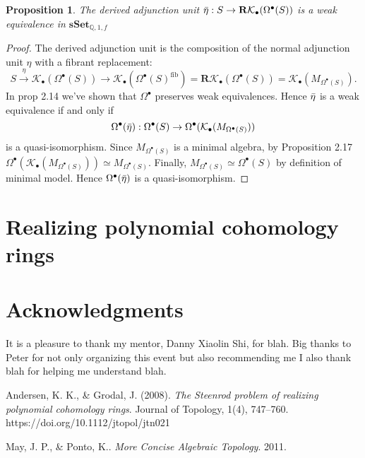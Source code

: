 \documentclass[psamsfonts]{amsart}
\newtheorem{prop}{Proposition}[section]
\theoremstyle{definition}
\newcommand{\Q}{\mathbb{Q}}
\newcommand{\sSet}{\mathbf{sSet}}
\numberwithin{equation}{section}
\begin{document}
\begin{prop}
The derived adjunction unit $\Bar{\eta}:S\to\mathbf{R}\mathcal{K}_\bullet(\Omega^\bullet(S))$ is a weak equivalence in $\sSet_{\Q,1,f}$
\end{prop}
\begin{proof}
The derived adjunction unit is the composition of the normal adjunction unit $\eta$ with a fibrant replacement:
\[S\xrightarrow{\ \eta\ }\mathcal{K}_\bullet(\Omega^\bullet(S))\longrightarrow\mathcal{K}_\bullet(\Omega^\bullet(S)^\textrm{fib})=\mathbf{R}\mathcal{K}_\bullet(\Omega^\bullet(S))=\mathcal{K}_\bullet(M_{\Omega^\bullet(S)}).\]
In prop 2.14 we've shown that $\Omega^\bullet$ preserves weak equivalences. Hence $\Bar{\eta}$ is a weak equivalence if and only if
\[\Omega^\bullet(\Bar{\eta}):\Omega^\bullet(S)\to\Omega^\bullet(\mathcal{K}_\bullet(M_{\Omega^\bullet(S)}))\]
is a quasi-isomorphism. Since $M_{\Omega^\bullet(S)}$ is a minimal algebra, by Proposition 2.17 $\Omega^\bullet(\mathcal{K}_\bullet(M_{\Omega^\bullet(S)}))\simeq M_{\Omega^\bullet(S)}$. Finally, $M_{\Omega^\bullet(S)}\simeq\Omega^\bullet(S)$ by definition of minimal model. Hence $\Omega^\bullet(\Bar{\eta})$ is a quasi-isomorphism.
\end{proof}


\section{Realizing polynomial cohomology rings}

\section*{Acknowledgments}

It is a pleasure to thank my mentor, Danny Xiaolin Shi, for blah. Big thanks to Peter for not only organizing this event but also recommending me I also thank blah for helping me understand blah.

\begin{thebibliography}{99}

Andersen, K. K., \& Grodal, J. (2008). \textit{The Steenrod problem of realizing polynomial cohomology rings}. Journal of Topology, 1(4), 747–760. https://doi.org/10.1112/jtopol/jtn021 

May, J. P., \& Ponto, K.. \textit{More Concise Algebraic Topology}. 2011.

\end{thebibliography}
\end{document}
